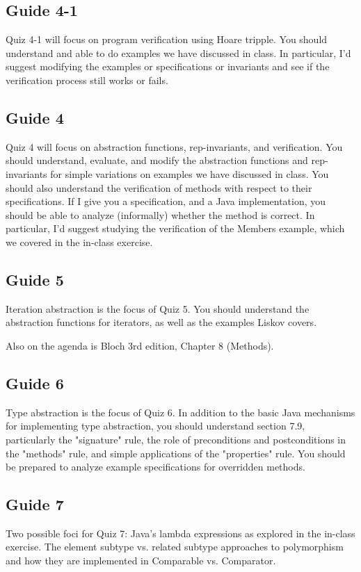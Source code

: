 \documentclass[11pt]{article}
\begin{document}
\subsection{Guide 4-1}
\label{sec:orgc575334}
Quiz 4-1 will focus on program verification using Hoare tripple. You should understand and able to do examples we have discussed in class. In particular, I'd suggest modifying the examples or specifications or invariants and see if the verification process still works or fails.



\subsection{Guide 4}
\label{sec:orgb1584d3}
Quiz 4 will focus on abstraction functions, rep-invariants, and verification. You should understand, evaluate, and modify the abstraction functions and rep-invariants for simple variations on examples we have discussed in class. You should also understand the verification of methods with respect to their specifications. If I give you a specification, and a Java implementation, you should be able to analyze (informally) whether the method is correct. In particular, I'd suggest studying the verification of the Members example, which we covered in the in-class exercise.


\subsection{Guide 5}
\label{sec:org86cae61}
Iteration abstraction is the focus of Quiz 5. You should understand the abstraction functions for iterators, as well as the examples Liskov covers.

Also on the agenda is Bloch 3rd edition, Chapter 8 (Methods).

\subsection{Guide 6}
\label{sec:orgc528c10}
Type abstraction is the focus of Quiz 6. In addition to the basic Java mechanisms for implementing type abstraction, you should understand section 7.9, particularly the "signature" rule, the role of preconditions and postconditions in the "methods" rule, and simple applications of the "properties" rule. You should be prepared to analyze example specifications for overridden methods.

\subsection{Guide 7}
\label{sec:org3a88e25}
Two possible foci for Quiz 7:
Java's lambda expressions as explored in the in-class exercise.
The element subtype vs. related subtype approaches to polymorphism and how they are implemented in Comparable vs. Comparator.
\end{document}
